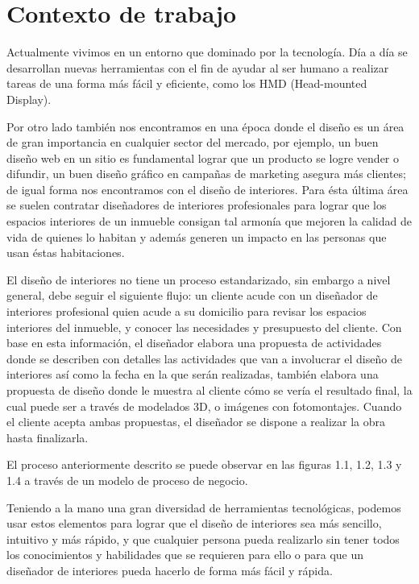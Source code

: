 \section{Contexto de trabajo}

Actualmente vivimos en un entorno que dominado por la tecnología. Día a día se desarrollan nuevas herramientas con el fin de ayudar al ser humano a realizar tareas de una forma más fácil y eficiente, como los HMD (Head-mounted Display)\cite{B15}.


Por otro lado también nos encontramos en una época donde el diseño es un área de gran importancia en cualquier sector del mercado, por ejemplo, un buen diseño web en un sitio es fundamental lograr que un producto se logre vender o difundir, un buen diseño gráfico en campañas de marketing asegura más clientes; de igual forma nos encontramos con el diseño de interiores. Para ésta última área se suelen contratar diseñadores de interiores profesionales para lograr que los espacios interiores de un inmueble consigan tal armonía que mejoren la calidad de vida de quienes lo habitan y además generen un impacto en las personas que usan éstas habitaciones.\par
El diseño de interiores no tiene un proceso estandarizado, sin embargo a nivel general, debe seguir el siguiente flujo: un cliente acude con un diseñador de interiores profesional quien acude a su domicilio para revisar los espacios interiores del inmueble, y conocer las necesidades y presupuesto del cliente. Con base en esta información, el diseñador elabora una propuesta de actividades donde se describen con detalles las actividades que van a involucrar el diseño de interiores así como la fecha en la que serán realizadas, también elabora una propuesta de diseño donde le muestra al cliente cómo se vería el resultado final, la cual puede ser a través de modelados 3D, o imágenes con fotomontajes. Cuando el cliente acepta ambas propuestas, el diseñador se dispone a realizar la obra hasta finalizarla.\par
El proceso anteriormente descrito se puede observar en las figuras 1.1, 1.2, 1.3 y 1.4 a través de un modelo de proceso de negocio.\par
Teniendo a la mano una gran diversidad de herramientas tecnológicas, podemos usar estos elementos para lograr que el diseño de interiores sea más sencillo, intuitivo y más rápido, y que cualquier persona pueda realizarlo sin tener todos los conocimientos y habilidades que se requieren para ello o para que un diseñador de interiores pueda hacerlo de forma más fácil y rápida.
\newpage

